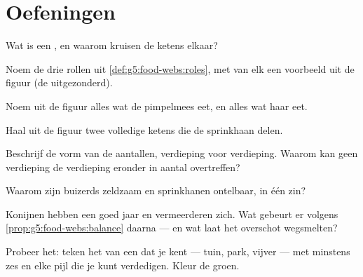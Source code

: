 \section{Oefeningen}

\begin{exercise}[$\star$]\label{exo:g5:food-webs:1}
Wat is een , en waarom kruisen de ketens elkaar?
\end{exercise}

\begin{exercise}[$\star$]\label{exo:g5:food-webs:2}
Noem de drie rollen uit \cref{def:g5:food-webs:roles}, met van elk een
voorbeeld uit de figuur (de  uitgezonderd).
\end{exercise}

\begin{exercise}[$\star$]\label{exo:g5:food-webs:3}
Noem uit de figuur alles wat de pimpelmees eet, en alles wat haar eet.
\end{exercise}

\begin{exercise}[$\star$]\label{exo:g5:food-webs:4}
Haal uit de figuur twee volledige ketens die de sprinkhaan delen.
\end{exercise}

\begin{exercise}[$\star$]\label{exo:g5:food-webs:5}
Beschrijf de vorm van de aantallen, verdieping voor verdieping. Waarom
kan geen verdieping de verdieping eronder in aantal overtreffen?
\end{exercise}

\begin{exercise}[$\star$]\label{exo:g5:food-webs:6}
Waarom zijn buizerds zeldzaam en sprinkhanen ontelbaar, in één zin?
\end{exercise}

\begin{exercise}[$\star$]\label{exo:g5:food-webs:7}
Konijnen hebben een goed jaar en vermeerderen zich. Wat gebeurt er
volgens \cref{prop:g5:food-webs:balance} daarna --- en wat laat het
overschot wegsmelten?
\end{exercise}

\begin{exercise}[$\star$]\label{exo:g5:food-webs:8}
Probeer het: teken het  van een  dat je kent ---
tuin, park, vijver --- met minstens zes  en elke pijl die je kunt
verdedigen. Kleur de  groen.
\end{exercise}

